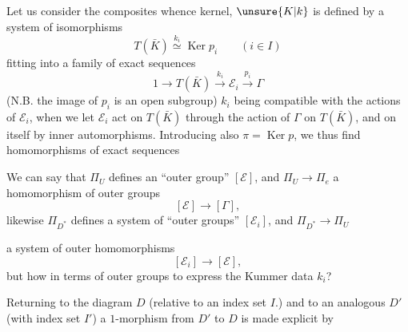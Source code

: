 
Let us consider the composites
whence kernel,  $\unsure{K|k}$ is defined by a system of isomorphisms
\[
T(\bar K)\overset{k_i}{\simeq}\operatorname{Ker}p_i\qquad(i\in I)
\]
fitting into a family of exact sequences
\[
1\longrightarrow T(\bar K)\xrightarrow{k_i}\mathcal E_i\xrightarrow{p_i}\Gamma
\]
(N.B. the image of $p_i$ is an open subgroup)
$k_i$ being compatible with the actions of $\mathcal E_i$, when we let $\mathcal E_i$ act on $T(\bar K)$ through the action of $\Gamma$ on $T(\bar K)$, and on itself by inner automorphisms. Introducing also $\pi=\operatorname{Ker}p$, we thus find homomorphisms of exact sequences

We can say that $\Pi_U$ defines an ``outer group'' $[\mathcal E]$, and $\Pi_U\longrightarrow\Pi_e$ a homomorphism of outer groups
\[
[\mathcal E]\longrightarrow[\Gamma],
\]
likewise $\Pi_{D^*}$ defines a system of ``outer groups'' $[\mathcal E_i]$, and  $\Pi_{D^*}\longrightarrow\Pi_U$


a system of outer homomorphisms
\[
[\mathcal E_i]\longrightarrow[\mathcal E],
\]
 but how in terms of outer groups to express the Kummer data $k_i$?

Returning to the  diagram $D$ (relative to an index set $I$.) and to an analogous $D'$ (with index set $I'$)
a $1$-morphism  from $D'$ to $D$ is made explicit by

